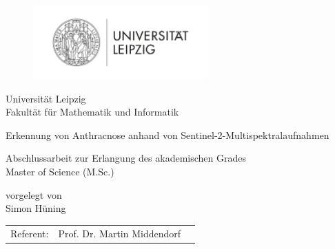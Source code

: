 \pagestyle{empty} %

\begin{figure}[t]
	\centering
	\includegraphics[width=0.6\textwidth]{pics/logo_uni_leipzig}
\end{figure}


\begin{center}
\Large Universität Leipzig \\
\normalsize Fakultät für Mathematik und Informatik\\

\vspace{105 pt}

\Huge Erkennung von Anthracnose anhand von Sentinel-2-Multispektralaufnahmen \\ 
\normalsize
\vspace{20 pt}

Abschlussarbeit zur Erlangung des akademischen Grades \\ 
Master of Science (M.Sc.) 

\vspace{60 pt}


vorgelegt von \\
\vspace{5 pt}
Simon Hüning 
\vspace{100 pt}

\begin{tabular}[h]{p{4cm}l l}
	Referent: & Prof. Dr. Martin Middendorf
\end{tabular}


\end{center}